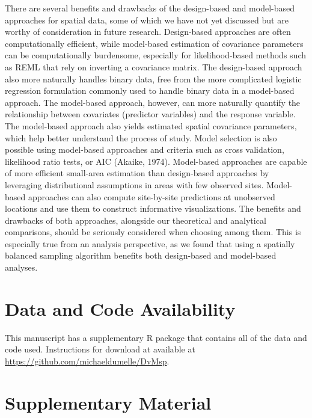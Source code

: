 \documentclass[]{elsarticle} %
\begin{document}
There are several benefits and drawbacks of the design-based and
model-based approaches for spatial data, some of which we have not yet
discussed but are worthy of consideration in future research.
Design-based approaches are often computationally efficient, while
model-based estimation of covariance parameters can be computationally
burdensome, especially for likelihood-based methods such as REML that
rely on inverting a covariance matrix. The design-based approach also
more naturally handles binary data, free from the more complicated
logistic regression formulation commonly used to handle binary data in a
model-based approach. The model-based approach, however, can more
naturally quantify the relationship between covariates (predictor
variables) and the response variable. The model-based approach also
yields estimated spatial covariance parameters, which help better
understand the process of study. Model selection is also possible using
model-based approaches and criteria such as cross validation, likelihood
ratio tests, or AIC (Akaike, 1974). Model-based approaches are capable
of more efficient small-area estimation than design-based approaches by
leveraging distributional assumptions in areas with few observed sites.
Model-based approaches can also compute site-by-site predictions at
unobserved locations and use them to construct informative
visualizations. The benefits and drawbacks of both approaches, alongside
our theoretical and analytical comparisons, should be seriously
considered when choosing among them. This is especially true from an
analysis perspective, as we found that using a spatially balanced
sampling algorithm benefits both design-based and model-based analyses.

\hypertarget{data-and-code-availability}{%
\section*{Data and Code Availability}\label{data-and-code-availability}}

This manuscript has a supplementary R package that contains all of the
data and code used. Instructions for download at available at
\url{https://github.com/michaeldumelle/DvMsp}.

\hypertarget{supplementary-material}{%
\section*{Supplementary Material}\label{supplementary-material}}
\end{document}
